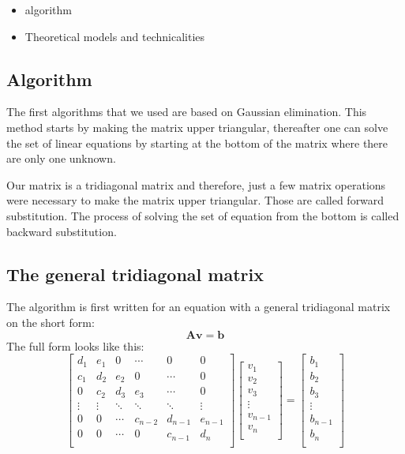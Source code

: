 \begin{itemize}

\item algorithm

\item Theoretical models and technicalities

\end{itemize}

\subsection{Algorithm}

The first algorithms that we used are based on Gaussian elimination. This method starts by making the matrix upper triangular, thereafter one can solve the set of linear equations by starting at the bottom of the matrix where there are only one unknown. 

Our matrix is a tridiagonal matrix and therefore, just a few matrix operations were necessary to make the matrix upper triangular. Those are called forward substitution. The process of solving the set of equation from the bottom is called backward substitution.

\subsection{The general tridiagonal matrix}
The algorithm is first written for an equation with a general tridiagonal matrix on the short form:
\[
\mathbf{A}\mathbf{v}=\mathbf{b}
\]
The full form looks like this:
\[
    \begin{bmatrix}
    	d_1& e_1& 0 &\cdots & 0 &0 \\
        c_1 & d_2 & e_2 &0 &\cdots &0 \\
        0&c_2 &d_3 & e_3 & \cdots & 0 \\
        \vdots& \vdots & \ddots &\ddots &\ddots & \vdots \\
        0&0 & \cdots &c_{n-2} &d_{n-1}& e_{n-1} \\
        0&0 & \cdots & 0  &c_{n-1} & d_n \\
        \end{bmatrix}
\begin{bmatrix}
	v_1\\
	v_2\\
	v_3\\
	\vdots\\
	v_{n-1}\\
	v_{n}\\
\end{bmatrix}=
\begin{bmatrix}
	b_1\\
	b_2\\
	b_3\\
	\vdots\\
	b_{n-1}\\
	b_{n}\\
\end{bmatrix}
\]

